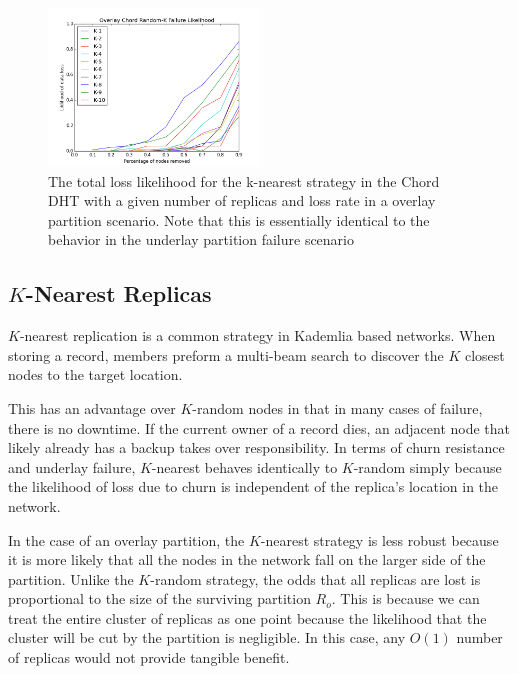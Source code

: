\begin{figure}[h!]
	\includegraphics[width=0.5\textwidth]{figs/overlay_chord_random}
	\caption{The total loss likelihood for the k-nearest strategy in the Chord DHT with a given number of replicas and loss rate in a overlay partition scenario. Note that this is essentially identical to the behavior in the underlay partition failure scenario}
\end{figure}



\subsection{$K$-Nearest Replicas}
$K$-nearest replication is a common strategy in Kademlia based networks.
When storing a record, members preform a multi-beam search to discover the $K$ closest nodes to the target location.

This has an advantage over $K$-random nodes in that in many cases of failure, there is no downtime.
If the current owner of a record dies, an adjacent node that likely already has a backup takes over responsibility.
In terms of churn resistance and underlay failure, $K$-nearest behaves identically to $K$-random simply because the likelihood of loss due to churn is independent of the replica's location in the network.

In the case of an overlay partition, the $K$-nearest strategy is less robust because it is more likely that all the nodes in the network fall on the larger side of the partition.
Unlike the $K$-random strategy, the odds that all replicas are lost is proportional to the size of the surviving partition $R_{o}$.
This is because we can treat the entire cluster of replicas as one point because the likelihood that the cluster will be cut by the partition is negligible.
In this case, any $O(1)$ number of replicas would not provide tangible benefit.


